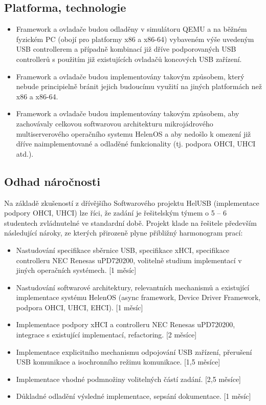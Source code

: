 \subsection{Platforma, technologie}

\begin{itemize}
	\item
	Framework a ovladače budou odladěny v simulátoru QEMU a na běžném fyzickém PC
	(obojí pro platformy x86 a x86-64) vybaveném výše uvedeným USB controllerem a
	případně kombinací již dříve podporovaných USB controllerů s použitím již existujících
	ovladačů koncových USB zařízení.

	\item
	Framework a ovladače budou implementovány takovým způsobem, který nebude
	principielně bránit jejich budoucímu využití na jiných platformách než x86 a x86-64.

	\item
	Framework a ovladače budou implementovány takovým způsobem, aby zachovávaly
	celkovou softwarovou architekturu mikrojádrového multiserverového operačního systemu
	HelenOS a aby nedošlo k omezení již dříve naimplementované a odladěné funkcionality (tj.
	podpora OHCI, UHCI atd.).
\end{itemize}


\subsection{Odhad náročnosti}

Na základě zkušeností z dřívějšího Softwarového projektu HelUSB (implementace podpory OHCI,
UHCI) lze říci, že zadání je řešitelským týmem o 5 – 6 studentech zvládnutelné ve standardní době.
Projekt klade na řešitele především následující nároky, ze kterých přirozeně plyne přibližný
harmonogram prací:

\begin{itemize}
	\item Nastudování specifikace sběrnice USB, specifikace xHCI, specifikace controlleru NEC Renesas uPD720200, volitelně studium implementací v jiných operačních systémech. [1 měsíc]

	\item Nastudování softwarové architektury, relevantních mechanismů a existující implementace systému HelenOS (async framework, Device Driver Framework, podpora OHCI, UHCI, EHCI). [1 měsíc]

	\item Implementace podpory xHCI a controlleru NEC Renesas uPD720200, integrace s existující implementací, refactoring. [2 měsíce]

	\item Implementace explicitního mechanismu odpojování USB zařízení, přerušení USB komunikace a isochronního režimu komunikace. [1,5 měsíce]

	\item Implementace vhodné podmnožiny volitelných částí zadání. [2,5 měsíce]

	\item Důkladné odladění výsledné implementace, sepsání dokumentace. [1 měsíc]
\end{itemize}

